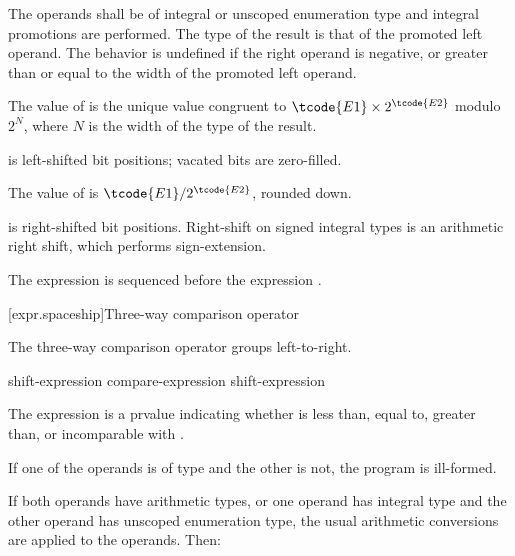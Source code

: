 The operands shall be of integral or unscoped enumeration type and integral
promotions are performed. The type of the result is that of the promoted
left operand.
%
The behavior is undefined if the right operand is negative, or greater
than or equal to the width of the promoted left operand.

\pnum
The value of  is the unique value congruent to
$\tcode{E1} \times 2^\tcode{E2}$ modulo $2^N$,
where $N$ is the width of the type of the result.
\begin{note}
 is left-shifted  bit positions;
vacated bits are zero-filled.
\end{note}

\pnum
The value of  is $\tcode{E1} / 2^\tcode{E2}$, rounded down.
\begin{note}
 is right-shifted  bit positions.
Right-shift on signed integral types is an arithmetic right shift,
which performs sign-extension.
\end{note}

\pnum
The expression  is sequenced before the expression .

[expr.spaceship]{Three-way comparison operator}
%
%

\pnum
The three-way comparison operator groups left-to-right.

%
%
%

\begin{bnf}
\br
    shift-expression\br
    compare-expression \terminal{<=>} shift-expression
\end{bnf}

\pnum
The expression  is a prvalue indicating whether
 is less than, equal to, greater than, or incomparable with
.

\pnum
If one of the operands is of type 
and the other is not, the program is ill-formed.

\pnum
If both operands have arithmetic types,
or one operand has integral type and
the other operand has unscoped enumeration type,
the usual arithmetic conversions are applied to the operands.
Then:


